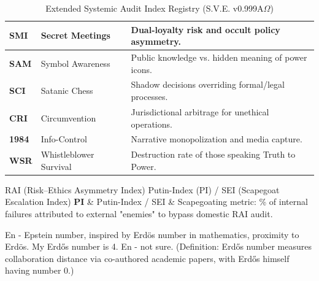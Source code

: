 \documentclass[11pt,a4paper]{article}
\theoremstyle{definition}
\theoremstyle{remark}
\begin{document}
\begin{table}[h!]
\begin{tabular}{|l|l|l|}
\textbf{SMI} & Secret Meetings & Dual-loyalty risk and occult policy asymmetry. \\ \hline
\textbf{SAM} & Symbol Awareness & Public knowledge vs. hidden meaning of power icons. \\ \hline
\textbf{SCI} & Satanic Chess & Shadow decisions overriding formal/legal processes. \\ \hline
\textbf{CRI} & Circumvention & Jurisdictional arbitrage for unethical operations. \\ \hline
\textbf{1984} & Info-Control & Narrative monopolization and media capture. \\ \hline
\textbf{WSR} & Whistleblower Survival & Destruction rate of those speaking Truth to Power. \\ \hline
\end{tabular}
\caption{Extended Systemic Audit Index Registry (S.V.E. v0.999A$\Omega$)}
\label{table:index_registry}
\end{table}

RAI (Risk–Ethics Asymmetry Index)
Putin-Index (PI) / SEI (Scapegoat Escalation Index)
\textbf{PI} & Putin-Index / SEI & Scapegoating metric: \% of internal failures attributed to external "enemies" to bypass domestic RAI audit. \\ \hline

En - Epstein number, inspired by Erdös number in mathematics, proximity to Erdös. My Erdős number is 4. En - not sure. 
(Definition: Erdős number measures collaboration distance via co-authored academic papers, with Erdős himself having number 0.)




\end{document}
